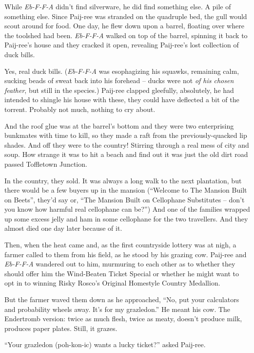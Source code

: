 \documentclass[12pt,twoside]{report}
\begin{document}
While {\em Eb-F-F-A} didn't find silverware, he did find something
else.  A pile of something else.  Since Paij-ree was stranded on the
quadruple bed, the gull would scout around for food.  One day, he flew
down upon a barrel, floating over where the toolshed had been.  {\em
  Eb-F-F-A} walked on top of the barrel, spinning it back to
Paij-ree's house and they cracked it open, revealing Paij-ree's lost
collection of duck bills.

Yes, real duck bills. ({\em Eb-F-F-A} was esophagizing his squawks,
remaining calm, sucking beads of sweat back into his forehead -- ducks
were not {\em of his chosen feather}, but still in the species.)
Paij-ree clapped gleefully, absolutely, he had intended to shingle his
house with these, they could have deflected a bit of the
torrent. Probably not much, nothing to cry about.

And the roof glue was at the barrel's bottom and they were two
enterprising bunkmates with time to kill, so they made a raft from the
previously-quacked lip shades.  And off they were to the country!
Stirring through a real mess of city and soup.  How strange it was to
hit a beach and find out it was just the old dirt road passed
Toffletown Junction.

In the country, they sold.  It was always a long walk to the next
plantation, but there would be a few buyers up in the mansion
(``Welcome to The Mansion Built on Beets'', they'd say or, ``The
Mansion Built on Cellophane Substitutes -- don't you know how harmful
real cellophane can be?'')  And one of the families wrapped up some
excess jelly and ham in some cellophane for the two travellers.  And
they almost died one day later because of it.

Then, when the heat came and, as the first countryside lottery was at
nigh, a farmer called to them from his field, as he stood by his
grazing cow. Paij-ree and {\em Eb-F-F-A} wandered out to him,
murmuring to each other as to whether they should offer him the
Wind-Beaten Ticket Special or whether he might want to opt in to
winning Risky Rosco's Original Homestyle Country Medallion.

But the farmer waved them down as he approached, ``No, put your
calculators and probability wheels away.  It's for my grazledon.''  He
meant his cow.  The Endertromb version: twice as much flesh, twice as
meaty, doesn't produce milk, produces paper plates.  Still, it grazes.

``Your grazledon (poh-kon-ic) wants a lucky ticket?'' asked Paij-ree.
\end{document}
